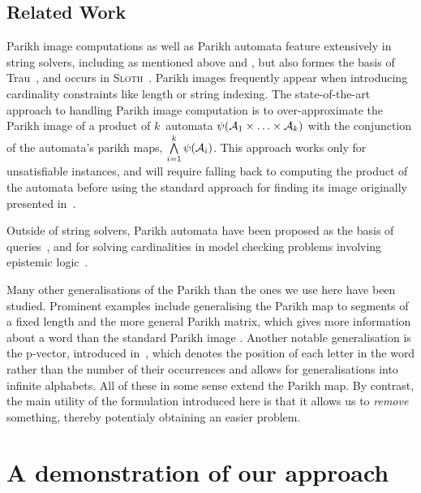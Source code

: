 \documentclass[acmsmall,review,anonymous,screen]{acmart}\settopmatter{printfolios=true,printccs=true,printacmref=true}
\theoremstyle{definition}
\begin{document}
\subsection{Related Work}

Parikh image computations as well as Parikh automata \cite{parikh-automata}
feature extensively in string solvers, including as mentioned above \Ostrich{}
and \OstrichPlus{} \cite{ostrich,ostrich-plus}, but also formes the basis of
Trau~\cite{trau-pldi}, and occurs in \textsc{Sloth}~\cite{sloth}. Parikh images
frequently appear when introducing cardinality constraints like length or string
indexing. The state-of-the-art approach to handling Parikh image computation is
to over-approximate the Parikh image of a product of $k$~automata
$\operatorname{\psi}(\mathcal{A}_1 \times \ldots \times \mathcal{A}_k)$ with the
conjunction of the automata's parikh maps, $\bigwedge\limits_{i=1} ^{k}
\operatorname{\psi}(\mathcal{A}_i)$. This approach works only for unsatisfiable instances,
and will require falling back to computing the product of the automata before
using the standard approach for finding its image originally presented in~\cite{generate-parikh-image}.

Outside of string solvers, Parikh automata have been proposed as the basis of
queries~\cite{graph-queries}, and for solving cardinalities in model checking
problems involving epistemic logic~\cite{epistemic-logic}.

Many other generalisations of the Parikh than the ones we use here have been
studied. Prominent examples include generalising the Parikh map to segments of a
fixed length \cite{KARHUMAKI1980155} and the more general Parikh matrix, which
gives more information about a word than the standard Parikh image
\cite{parikh-matrix}. Another notable generalisation is the p-vector, introduced
in~\cite{infinite-words}, which denotes the position of each letter in the word
rather than the number of their occurrences and allows for generalisations into
infinite alphabets. All of these in some sense extend the Parikh map. By
contrast, the main utility of the formulation introduced here is that it allows
us to \emph{remove} something, thereby potentialy obtaining an easier problem.

\section{A demonstration of our approach}\label{sec:motivation}
\end{document}

